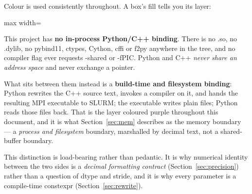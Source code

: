 \documentclass[11pt,a4paper]{article}
\newcommand{\code}[1]{{\ttfamily #1}}
\begin{document}
Colour is used consistently throughout. A box's fill tells you its layer:

\medskip
\begin{center}
\begin{adjustbox}{max width=\linewidth}
\end{adjustbox}
\end{center}
\medskip

\begin{keybox}[title={A note on the word \emph{binding}}]
This project has \textbf{no in-process Python/C++ binding}. There is no
\code{.so}, no \code{.dylib}, no \code{pybind11}, \code{ctypes}, \code{Cython},
\code{cffi} or \code{f2py} anywhere in the tree, and no compiler flag ever
requests \code{-shared} or \code{-fPIC}. Python and C++ \emph{never share an
address space} and never exchange a pointer.

What sits between them instead is a \textbf{build-time and filesystem binding}:
Python rewrites the C++ source text, invokes a compiler on it, and hands the
resulting MPI executable to SLURM; the executable writes plain files; Python
reads those files back. That is the layer coloured purple throughout this
document, and it is what Section~\ref{sec:mem} describes as the memory
boundary --- a \emph{process and filesystem} boundary, marshalled by decimal
text, not a shared-buffer boundary.

This distinction is load-bearing rather than pedantic. It is why numerical
identity between the two sides is a \emph{decimal formatting contract}
(Section~\ref{sec:precision}) rather than a question of dtype and stride, and
it is why every parameter is a compile-time \code{constexpr}
(Section~\ref{sec:rewrite}).
\end{keybox}
\end{document}
